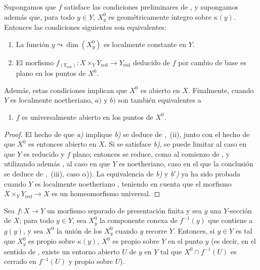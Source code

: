 \begin{corollary}[15.6.7]
\label{IV.15.6.7}
Supongamos que $f$ satisface las condiciones preliminares de , y supongamos además que, para todo $y\in Y$, $X_y^0$ es geométricamente íntegro sobre $\kappa(y)$.
Entonces las condiciones siguientes son equivalentes:
\begin{enumerate}[label=\emph{\alph*)}]
  \item La función $y\leadsto\dim(X_y^0)$ es localmente constante en $Y$.
  \item El morfismo $f_{(Y_\mathrm{red})}:X\times_Y Y_\mathrm{red}\to Y_\mathrm{red}$ deducido de $f$ por cambio de base es plano en los puntos de $X^0$.
\end{enumerate}
Además, estas condiciones implican que $X^0$ es abierto en $X$.
Finalmente, cuando $Y$ es localmente noetheriano, $a)$ y $b)$ son también equivalentes a
\begin{enumerate}
  \item[\rm b$'$)] $f$ es universalmente abierto en los puntos de $X^0$.
\end{enumerate}
\end{corollary}

\begin{proof}
El hecho de que \emph{a)} implique \emph{b)} se deduce de ,~(ii), junto con el hecho de que $X^0$ es entonces abierto en $X$.
Si se satisface \emph{b)}, se puede limitar al caso en que $Y$ es reducido y $f$ plano; entonces se reduce, como al comienzo de , y utilizando además , al caso en que $Y$ es noetheriano, caso en el que la conclusión se deduce de ,~(iii), caso $\alpha$)).
La equivalencia de \emph{b)} y \emph{b$'$)} ya ha sido probada cuando $Y$ es localmente noetheriano , teniendo en cuenta que el morfismo $X\times_Y Y_\mathrm{red}\to X$ es un homeomorfismo universal.
\end{proof}

\begin{proposition}[15.6.8]
\label{IV.15.6.8}
Sea $f:X\to Y$ un morfismo separado de presentación finita y sea $g$ una $Y$-sección de $X$; para todo $y\in Y$, sea $X_y^0$ la componente conexa de $f^{-1}(y)$ que contiene a $g(y)$, y sea $X^0$ la unión de los $X_y^0$ cuando $y$ recorre $Y$.
Entonces, si $y\in Y$ es tal que $X_y^0$ es propio sobre $\kappa(y)$, $X^0$ es propio sobre $Y$ en el punto $y$ \textup{(es decir, en el sentido de , existe un entorno abierto $U$ de $y$ en $Y$ tal que $X^0\cap f^{-1}(U)$ es cerrado en $f^{-1}(U)$ y propio sobre $U$)}.
\end{proposition}

